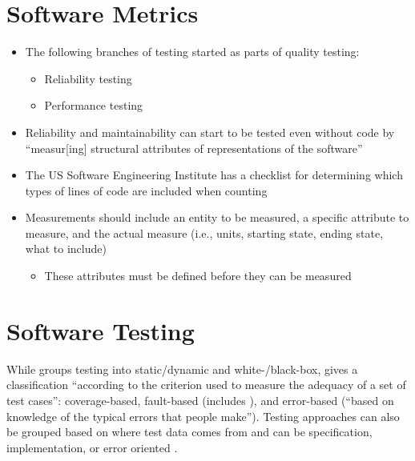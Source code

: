 \section{Software Metrics}
\label{chap:notes:sec:software-metrics}

\begin{itemize}
      \item The following branches of testing started as parts of quality
            testing:
            \begin{itemize}
                  \item Reliability testing \cite[p.~18, ch.~10]{fenton_software_1997}
                  \item Performance testing \cite[p.~18, ch.~7]{fenton_software_1997}
            \end{itemize}
      \item Reliability and maintainability can start to be tested even without
            code by ``measur[ing] structural attributes of representations of the
            software'' \cite[p.~18]{fenton_software_1997}
      \item The US Software Engineering Institute has a checklist for determining
            which types of lines of code are included when counting
            \cite[pp.~30-31]{fenton_software_1997}
      \item Measurements should include an entity to be measured, a specific
            attribute to measure, and the actual measure (i.e., units, starting
            state, ending state, what to include) \cite[p.~36]{fenton_software_1997}
            \begin{itemize}
                  \item These attributes must be defined before they can be
                        measured \cite[p.~38]{fenton_software_1997}
            \end{itemize}
\end{itemize}

\section{Software Testing}
\label{chap:notes:sec:software-testing}

While \cite{patton_software_2006} groups testing into static/dynamic and
white-/black-box, \cite[pp.~398-399]{van_vliet_software_2000} gives a
classification ``according to the criterion used to measure the adequacy of a
set of test cases'': coverage-based, fault-based (includes
),
and error-based (``based on knowledge of the typical errors that people make'').
Testing approaches can also be grouped based on where test data comes from and
can be specification, implementation, or error oriented
\cite[p.~440]{peters_software_2000}.

